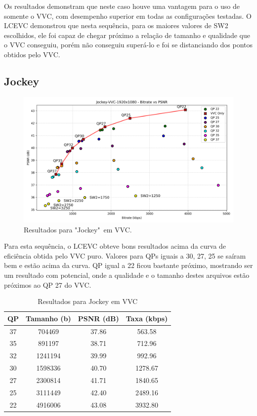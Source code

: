 Os resultados demonstram que neste caso houve uma vantagem para o uso de
somente o \acrshort{VVC}, com desempenho superior em todas as configurações testadas.
O \acrshort{LCEVC} demonstrou que nesta sequência, para os maiores valores de SW2 escolhidos, ele foi
capaz de chegar próximo a relação de tamanho e qualidade que o \acrshort{VVC} conseguiu,
porém não conseguiu superá-lo e foi se distanciando dos pontos obtidos pelo \acrshort{VVC}. 

\newpage
\subsection{Jockey}

\begin{figure}[h]
    \centering
    \includegraphics[width=1.0\textwidth]{img/Jockey-VVC.png}
    \caption{Resultados para "Jockey"\ em \acrshort{VVC}. \cite{uvg_dataset}}
    \label{fig:Jockey-VVC}
\end{figure}

Para esta sequência, o \acrshort{LCEVC} obteve bons resultados acima da curva de eficiência
obtida pelo \acrshort{VVC} puro. Valores para QPs iguais a 30, 27, 25 se saíram bem e estão
acima da curva. QP igual a 22 ficou bastante próximo, mostrando ser um resultado com potencial,
onde a qualidade e o tamanho destes arquivos estão próximos ao QP 27 do \acrshort{VVC}.

\begin{table}[h]
    \centering
    \begin{tabular}{|c|c|c|c|}
        \hline
        \textbf{QP} & \textbf{Tamanho (b)} & \textbf{PSNR (dB)} & \textbf{Taxa (kbps)} \\
        \hline
        37 & 704469 & 37.86 & 563.58 \\
        35 & 891197 & 38.71 & 712.96 \\
        32 & 1241194 & 39.99 & 992.96 \\
        30 & 1598336 & 40.70 & 1278.67 \\
        27 & 2300814 & 41.71 & 1840.65 \\
        25 & 3111449 & 42.40 & 2489.16 \\
        22 & 4916006 & 43.08 & 3932.80 \\
        \hline
    \end{tabular}
    \caption{Resultados para Jockey em VVC}
    \label{tab:jockey-vvc}
\end{table}


